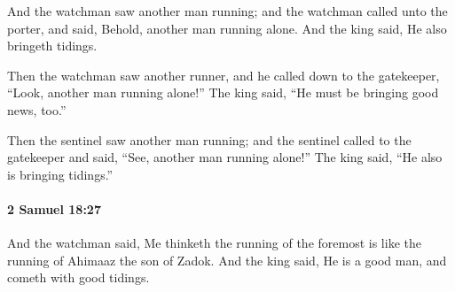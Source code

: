 			\begin{versebox}
					\item[BHS] 
					\item[ASV] And the watchman saw another man running; and the watchman called unto the porter, and said, Behold, another man running alone. And the king said, He also bringeth tidings.
					\item[NIV] Then the watchman saw another runner, and he called down to the gatekeeper, “Look, another man running alone!” The king said, “He must be bringing good news, too.”
					\item[NRSV] Then the sentinel saw another man running; and the sentinel called to the gatekeeper and said, “See, another man running alone!” The king said, “He also is bringing tidings.”
			\end{versebox}

		\paragraph{2 Samuel 18:27} %
			\label{2SAMUEL-18-27}

			And the watchman said, Me thinketh the running of the foremost is like the running of Ahimaaz the son of Zadok. And the king said, He is a good man, and cometh with good tidings.

